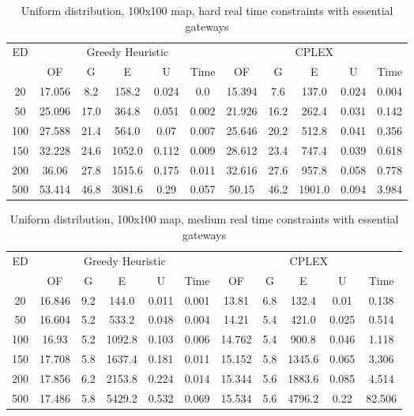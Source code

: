 \begin{table}[htb]
	\centering
	\begin{tabular}{|c|c|c|c|c|c|c|c|c|c|c|}
		\hline
		\multirow{2}{*}{ED} & \multicolumn{5}{c|}{Greedy Heuristic} & \multicolumn{5}{c|}{CPLEX}\\ 
		\cline{2-11}
& OF & G & E & U & Time & OF & G & E & U & Time\\ 
		\hline
		20 & 17.056 & 8.2 & 158.2 & 0.024 & 0.0 & 15.394 & 7.6 & 137.0 & 0.024 & 0.004 \\ 
		50 & 25.096 & 17.0 & 364.8 & 0.051 & 0.002 & 21.926 & 16.2 & 262.4 & 0.031 & 0.142 \\ 
		100 & 27.588 & 21.4 & 564.0 & 0.07 & 0.007 & 25.646 & 20.2 & 512.8 & 0.041 & 0.356 \\ 
		150 & 32.228 & 24.6 & 1052.0 & 0.112 & 0.009 & 28.612 & 23.4 & 747.4 & 0.039 & 0.618 \\ 
		200 & 36.06 & 27.8 & 1515.6 & 0.175 & 0.011 & 32.616 & 27.6 & 957.8 & 0.058 & 0.778 \\ 
		500 & 53.414 & 46.8 & 3081.6 & 0.29 & 0.057 & 50.15 & 46.2 & 1901.0 & 0.094 & 3.984 \\ 
		\hline 
	\end{tabular} 
	\caption{Uniform distribution, 100x100 map, hard real time constraints with essential gateways} 
	\label{tab:unif_hard_esc_100} 
\end{table} 

\begin{table}[htb]
	\centering
	\begin{tabular}{|c|c|c|c|c|c|c|c|c|c|c|}
		\hline
		\multirow{2}{*}{ED} & \multicolumn{5}{c|}{Greedy Heuristic} & \multicolumn{5}{c|}{CPLEX}\\ 
		\cline{2-11}
& OF & G & E & U & Time & OF & G & E & U & Time\\ 
		\hline
		20 & 16.846 & 9.2 & 144.0 & 0.011 & 0.001 & 13.81 & 6.8 & 132.4 & 0.01 & 0.138 \\ 
		50 & 16.604 & 5.2 & 533.2 & 0.048 & 0.004 & 14.21 & 5.4 & 421.0 & 0.025 & 0.514 \\ 
		100 & 16.93 & 5.2 & 1092.8 & 0.103 & 0.006 & 14.762 & 5.4 & 900.8 & 0.046 & 1.118 \\ 
		150 & 17.708 & 5.8 & 1637.4 & 0.181 & 0.011 & 15.152 & 5.8 & 1345.6 & 0.065 & 3.306 \\ 
		200 & 17.856 & 6.2 & 2153.8 & 0.224 & 0.014 & 15.344 & 5.6 & 1883.6 & 0.085 & 4.514 \\ 
		500 & 17.486 & 5.8 & 5429.2 & 0.532 & 0.069 & 15.534 & 5.6 & 4796.2 & 0.22 & 82.506 \\ 
		\hline 
	\end{tabular} 
	\caption{Uniform distribution, 100x100 map, medium real time constraints with essential gateways} 
	\label{tab:unif_medium_esc_100} 
\end{table} 

